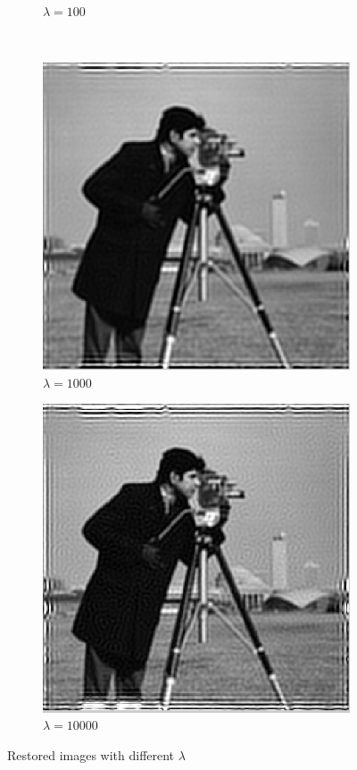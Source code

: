 \documentclass[a4paper, 10pt, conference] {article}
\begin{document}
\begin{figure}[H]
\begin{subfigure}{0.49\textwidth}
		\caption{$\lambda = 100$}
	\end{subfigure}\\
	\begin{subfigure}{0.49\textwidth} 
		\centering						
		\includegraphics[scale=0.48]{gaussian/no_noise/lam1000.PNG}
		\caption{$\lambda = 1000$}
	\end{subfigure}
	\begin{subfigure}{0.49\textwidth} 
		\centering						
		\includegraphics[scale=0.48]{gaussian/no_noise/lam10000.PNG}
		\caption{$\lambda = 10000$}
	\end{subfigure}
	\caption{Restored images with different $\lambda$}
	\label{noNoiseRecovered2}
\end{figure}
\end{document}
